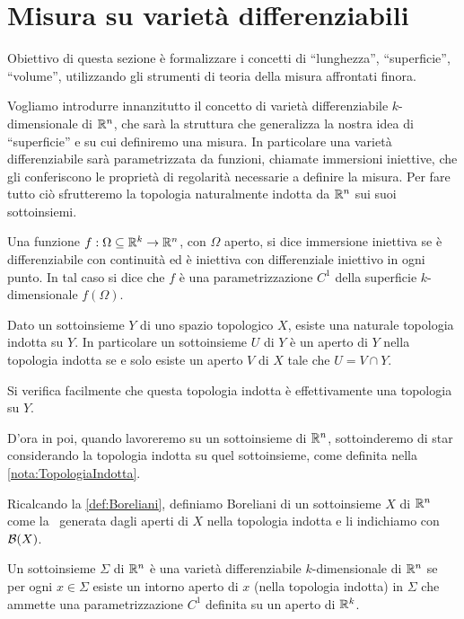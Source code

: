 \section{Misura su varietà differenziabili}
Obiettivo di questa sezione è formalizzare i concetti di ``lunghezza'', ``superficie'', ``volume'', utilizzando gli strumenti di teoria della misura affrontati finora. 

Vogliamo introdurre innanzitutto il concetto di varietà differenziabile $k$-dimensionale di $\mathbb R^n$, che sarà la struttura che generalizza la nostra idea di ``superficie'' e su cui definiremo una misura. In particolare una varietà differenziabile sarà parametrizzata da funzioni, chiamate immersioni iniettive, che gli conferiscono le proprietà di regolarità necessarie a definire la misura.
Per fare tutto ciò sfrutteremo la topologia naturalmente indotta da $\mathbb R^n$ sui suoi sottoinsiemi.

\begin{definition}
	Una funzione $f:\Omega \subseteq \mathbb R^k\to\mathbb R^n$, con $\Omega$ aperto, si dice immersione iniettiva se è differenziabile con continuità ed è iniettiva con differenziale iniettivo in ogni punto. In tal caso si dice che $f$ è una parametrizzazione $C^1$ della superficie $k$-dimensionale $f(\Omega)$.
\end{definition}

\begin{remark}\label{nota:TopologiaIndotta}
	Dato un sottoinsieme $Y$ di uno spazio topologico $X$, esiste una naturale topologia indotta su $Y$. In particolare un sottoinsieme $U$ di $Y$ è un aperto di $Y$ nella topologia indotta se e solo esiste un aperto $V$ di $X$ tale che $U=V\cap Y$. 
	
	Si verifica facilmente che questa topologia indotta è effettivamente una topologia su $Y$.
\end{remark}

D'ora in poi, quando lavoreremo su un sottoinsieme di $\mathbb R^n$, sottoinderemo di star considerando la topologia indotta su quel sottoinsieme, come definita nella \cref{nota:TopologiaIndotta}.

\begin{definition}\label{def:BorelianiSottoinsieme}
	Ricalcando la \cref{def:Boreliani}, definiamo Boreliani di un sottoinsieme $X$ di $\mathbb R^n$ come la \sigalg\ generata dagli aperti di $X$ nella topologia indotta e li indichiamo con $\mathcal B(X)$.
\end{definition}

\begin{definition}
	Un sottoinsieme $\Sigma$ di $\mathbb R^n$ è una varietà differenziabile $k$-dimensionale di $\mathbb R^n$ se per ogni $x\in\Sigma$ esiste un intorno aperto di $x$ (nella topologia indotta) in $\Sigma$ che ammette una parametrizzazione $C^1$ definita su un aperto di $\mathbb R^k$.
\end{definition}

